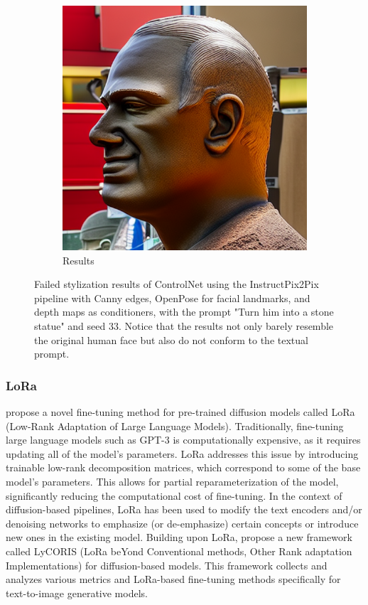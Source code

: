 \begin{figure}[ht]
\begin{subfigure}{0.18\linewidth}
        \includegraphics[width=\textwidth]{Figures/failed/controlnet/0-C-5-1-5386_212530_574.png}
		\caption{Results}
	\end{subfigure}
    \caption{Failed stylization results of ControlNet using the InstructPix2Pix pipeline with Canny edges, OpenPose for facial landmarks, and depth maps as conditioners, with the prompt "Turn him into a stone statue" and seed 33. Notice that the results not only barely resemble the original human face but also do not conform to the textual prompt.}
    \label{fig:controlnet_failed}
\end{figure}

\subsubsection{LoRa}

\textcite{Hu.2021} propose a novel fine-tuning method for pre-trained diffusion models called LoRa (Low-Rank Adaptation of Large Language Models). Traditionally, fine-tuning large language models such as GPT-3 is computationally expensive, as it requires updating all of the model's parameters. LoRa addresses this issue by introducing trainable low-rank decomposition matrices, which correspond to some of the base model's parameters. This allows for partial reparameterization of the model, significantly reducing the computational cost of fine-tuning. In the context of diffusion-based pipelines, LoRa has been used to modify the text encoders and/or denoising networks to emphasize (or de-emphasize) certain concepts or introduce new ones in the existing model. Building upon LoRa, \textcite{Yeh.2023} propose a new framework called LyCORIS (LoRa beYond Conventional methods, Other Rank adaptation Implementations) for diffusion-based models. This framework collects and analyzes various metrics and LoRa-based fine-tuning methods specifically for text-to-image generative models.

